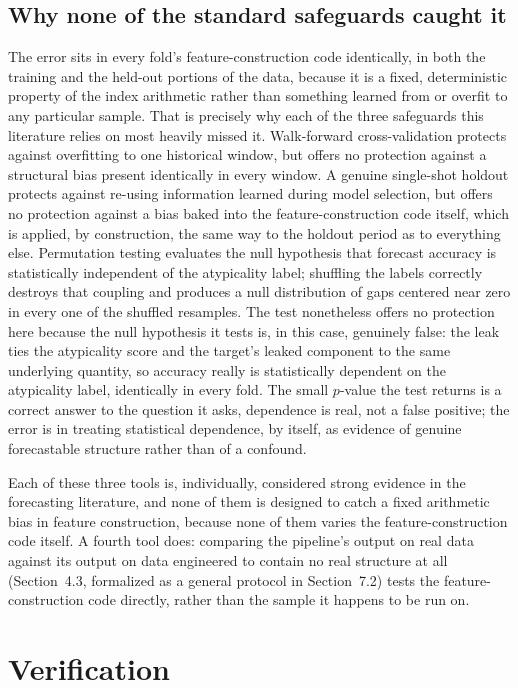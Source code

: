 \documentclass[preprint,12pt]{elsarticle}
\begin{document}
\subsection{Why none of the standard safeguards caught it}
The error sits in every fold's feature-construction code identically, in both the training and
the held-out portions of the data, because it is a fixed, deterministic property of the index
arithmetic rather than something learned from or overfit to any particular sample. That is
precisely why each of the three safeguards this literature relies on most heavily missed it.
Walk-forward cross-validation protects against overfitting to one historical window, but offers
no protection against a structural bias present identically in every window. A genuine
single-shot holdout protects against re-using information learned during model selection, but
offers no protection against a bias baked into the feature-construction code itself, which is
applied, by construction, the same way to the holdout period as to everything else. Permutation
testing evaluates the null hypothesis that forecast accuracy is statistically independent of the
atypicality label; shuffling the labels correctly destroys that coupling and produces a
null distribution of gaps centered near zero in every one of the shuffled resamples. The test
nonetheless offers no protection here because the null hypothesis it tests is, in this case,
genuinely false: the leak ties the atypicality score and the target's leaked component to the
same underlying quantity, so accuracy really is statistically dependent on the atypicality
label, identically in every fold. The small $p$-value the test returns is a correct answer to
the question it asks, dependence is real, not a false positive; the error is in treating
statistical dependence, by itself, as evidence of genuine forecastable structure rather than of
a confound.

Each of these three tools is, individually, considered strong evidence in the forecasting
literature, and none of them is designed to catch a fixed arithmetic bias in feature
construction, because none of them varies the feature-construction code itself. A fourth tool
does: comparing the pipeline's output on real data against its output on data engineered to
contain no real structure at all (Section~4.3, formalized as a general protocol in
Section~7.2) tests the feature-construction code directly, rather than the sample it happens to
be run on.

\section{Verification}
\label{sec:verification}
\end{document}
